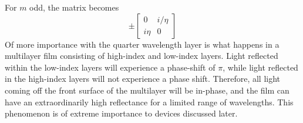 \documentclass{article}
\begin{document}
    For $m$ odd, the matrix becomes
    \begin{equation*}
        \pm
        \begin{bmatrix}
            0 & i/\eta \\
            i \eta & 0
        \end{bmatrix}
    \end{equation*}
    Of more importance with the quarter wavelength layer is what happens in a multilayer film consisting of high-index and low-index layers. Light reflected within the low-index layers will experience a phase-shift of $\pi$, while light reflected in the high-index layers will not experience a phase shift. Therefore, all light coming off the front surface of the multilayer will be in-phase, and the film can have an extraordinarily high reflectance for a limited range of wavelengths. This phenomenon is of extreme importance to devices discussed later.
\end{document}
